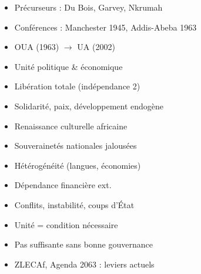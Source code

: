 \documentclass[11pt]{article}
\begin{document}
\begin{popfigure}
\begin{tcbraster}[raster columns=3,raster equal height=rows,raster column skip=6pt,raster row skip=6pt,enhanced,blankest]
\begin{tcolorbox}
\begin{itemize}[nosep,leftmargin=*,itemsep=1pt,font=\scriptsize]
\item Précurseurs : Du Bois, Garvey, Nkrumah
\item Conférences : Manchester 1945, Addis-Abeba 1963
\item OUA (1963) $\to$ UA (2002)
\end{itemize}
\end{tcolorbox}
\begin{tcolorbox}[enhanced,colback=white,colframe=poppink,boxrule=0.9pt,arc=3pt,title={4. Objectifs},fonttitle=\bfseries\scriptsize,coltitle=white,colbacktitle=poppink,left=4pt,right=4pt,top=2pt,bottom=2pt,boxsep=1pt,toptitle=1.5pt,bottomtitle=1.5pt,halign=left]
\begin{itemize}[nosep,leftmargin=*,itemsep=1pt,font=\scriptsize]
\item Unité politique \& économique
\item Libération totale (indépendance 2)
\item Solidarité, paix, développement endogène
\item Renaissance culturelle africaine
\end{itemize}
\end{tcolorbox}
\begin{tcolorbox}[enhanced,colback=white,colframe=popgold,boxrule=0.9pt,arc=3pt,title={5. Difficultés},fonttitle=\bfseries\scriptsize,coltitle=white,colbacktitle=popgold,left=4pt,right=4pt,top=2pt,bottom=2pt,boxsep=1pt,toptitle=1.5pt,bottomtitle=1.5pt,halign=left]
\begin{itemize}[nosep,leftmargin=*,itemsep=1pt,font=\scriptsize]
\item Souverainetés nationales jalousées
\item Hétérogénéité (langues, économies)
\item Dépendance financière ext.
\item Conflits, instabilité, coups d'État
\end{itemize}
\end{tcolorbox}
\begin{tcolorbox}[enhanced,colback=white,colframe=popdark,boxrule=0.9pt,arc=3pt,title={6. Synthèse},fonttitle=\bfseries\scriptsize,coltitle=white,colbacktitle=popdark,left=4pt,right=4pt,top=2pt,bottom=2pt,boxsep=1pt,toptitle=1.5pt,bottomtitle=1.5pt,halign=left]
\begin{itemize}[nosep,leftmargin=*,itemsep=1pt,font=\scriptsize]
\item Unité = condition nécessaire
\item Pas suffisante sans bonne gouvernance
\item ZLECAf, Agenda 2063 : leviers actuels
\end{itemize}
\end{tcolorbox}
\end{tcbraster}


\end{popfigure}
\end{document}
